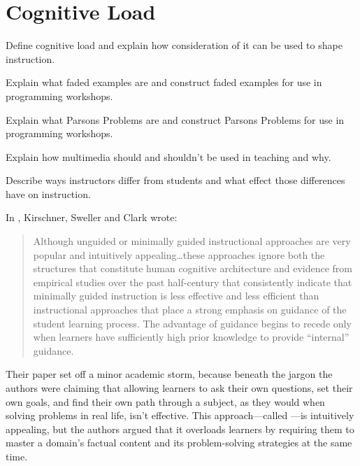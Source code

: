 \chapter{Cognitive Load}\label{s:load}

\begin{objectives}

\item
  Define cognitive load and explain how consideration of it can be
  used to shape instruction.

\item
  Explain what faded examples are and construct faded examples for use
  in programming workshops.

\item
  Explain what Parsons Problems are and construct Parsons Problems for
  use in programming workshops.

\item
  Explain how multimedia should and shouldn't be used in teaching and
  why.

\item
  Describe ways instructors differ from students and what effect those
  differences have on instruction.

\end{objectives}

In \cite{Kirs2006}, Kirschner, Sweller and Clark wrote:

\begin{quote}

  Although unguided or minimally guided instructional approaches are
  very popular and intuitively appealing{\ldots}these approaches
  ignore both the structures that constitute human cognitive
  architecture and evidence from empirical studies over the past
  half-century that consistently indicate that minimally guided
  instruction is less effective and less efficient than instructional
  approaches that place a strong emphasis on guidance of the student
  learning process. The advantage of guidance begins to recede only
  when learners have sufficiently high prior knowledge to provide
  ``internal'' guidance.

\end{quote}

Their paper set off a minor academic storm, because beneath the jargon
the authors were claiming that allowing learners to ask their own
questions, set their own goals, and find their own path through a
subject, as they would when solving problems in real life, isn't
effective.  This approach---called
---is
intuitively appealing, but the authors argued that it overloads
learners by requiring them to master a domain's factual content and
its problem-solving strategies at the same time.

